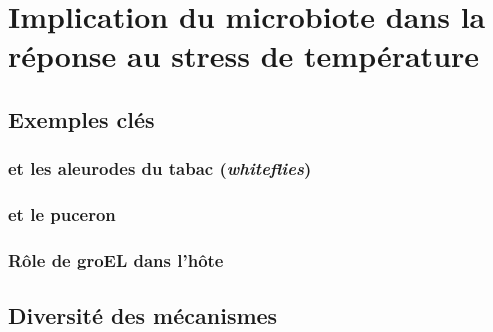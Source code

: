 \chapter{Implication du microbiote dans la réponse au stress de température} %
\label{sec:implicationµbiote}
	
	\section{Exemples clés} %
	\label{sec:exemples}
		

		\subsection{ et les aleurodes du tabac (\textit{whiteflies})} %
		\label{sub:rickettsia_et_les_aleurodes_}
			

		\subsection{ et le puceron} %
		\label{sub:exemple_buchnera}
			

		\subsection{Rôle de groEL dans l'hôte } %
		\label{sub:groel}
			

	\section{Diversité des mécanismes} %
	\label{sec:diversit_des_m_canismes}
		
		